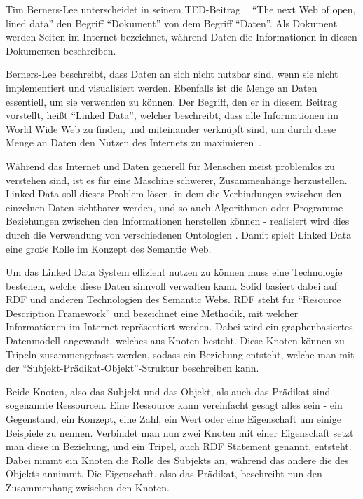 \documentclass[acmtog]{acmart}
\begin{document}
Tim Berners-Lee unterscheidet in seinem TED-Beitrag ~\cite{TED.2010} "`The next Web of open, lined data"' den Begriff "`Dokument"' von dem Begriff "`Daten"'. Als Dokument werden Seiten im Internet bezeichnet, während Daten die Informationen in diesen Dokumenten beschreiben. 

Berners-Lee beschreibt, dass Daten an sich nicht nutzbar sind, wenn sie nicht implementiert und visualisiert werden. Ebenfalls ist die Menge an Daten essentiell, um sie verwenden zu können. Der Begriff, den er in diesem Beitrag vorstellt, heißt "`Linked Data"', welcher beschreibt, dass alle Informationen im World Wide Web zu finden, und miteinander verknüpft sind, um durch diese Menge an Daten den Nutzen des Internets zu maximieren~\cite{TED.2010}. 

Während das Internet und Daten generell für Menschen meist problemlos zu verstehen sind, ist es für eine Maschine schwerer, Zusammenhänge herzustellen. Linked Data soll dieses Problem lösen, in dem die Verbindungen zwischen den einzelnen Daten sichtbarer werden, und so auch Algorithmen oder Programme Beziehungen zwischen den Informationen herstellen können - realisiert wird dies durch die Verwendung von verschiedenen Ontologien \cite{bernerslee1998semanticwebroadmap}. Damit spielt Linked Data eine große Rolle im Konzept des Semantic Web.

Um das Linked Data System effizient nutzen zu können muss eine Technologie bestehen, welche diese Daten sinnvoll verwalten kann. Solid basiert dabei auf RDF und anderen Technologien des Semantic Webs. RDF steht für "`Resource Description Framework"' und bezeichnet eine Methodik, mit welcher Informationen im Internet repräsentiert werden. Dabei wird ein graphenbasiertes Datenmodell angewandt, welches aus Knoten besteht. Diese Knoten können zu Tripeln zusammengefasst werden, sodass ein Beziehung entsteht, welche man mit der "`Subjekt-Prädikat-Objekt"'-Struktur beschreiben kann.~\cite{Wood:14:RCA, Bizer2009LinkedD} 

Beide Knoten, also das Subjekt und das Objekt, als auch das Prädikat sind sogenannte Ressourcen. Eine Ressource kann vereinfacht gesagt alles sein - ein Gegenstand, ein Konzept, eine Zahl, ein Wert oder eine Eigenschaft um einige Beispiele zu nennen. Verbindet man nun zwei Knoten mit einer Eigenschaft setzt man diese in Beziehung, und ein Tripel, auch RDF Statement genannt, entsteht. Dabei nimmt ein Knoten die Rolle des Subjekts an, während das andere die des Objekts annimmt. Die Eigenschaft, also das Prädikat, beschreibt nun den Zusammenhang zwischen den Knoten.~\cite{Wood:14:RCA, Bizer2009LinkedD}
\end{document}
